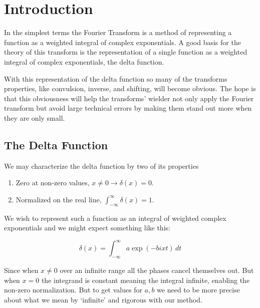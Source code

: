\chapter{Introduction}
In the simplest terms the Fourier Transform is a method of representing a function as a weighted integral of complex exponentials.
A good basis for the theory of this transform is the representation of a single function as a weighted integral of complex exponentials, the delta function.

With this representation of the delta function so many of the transforms properties, like convulsion, inverse, and shifting, will become obvious.
The hope is that this obviousness will help the transforms' wielder not only apply the Fourier transform but avoid large technical errors by making them stand out more when they are only small.

\section{The Delta Function}
We may characterize the delta function by two of its properties
\begin{enumerate}
\item Zero at non-zero values, $x\neq 0 \rightarrow \delta(x) = 0$.
\item Normalized on the real line, $\int_{-\infty}^{\infty}\delta(x) = 1$.
\end{enumerate}

We wish to represent such a function as an integral of weighted complex exponentials and we might expect something like this:

\[\delta(x) = \int_{-\infty}^{\infty}a\exp(-bixt)\,dt\]

Since when $x\neq 0$ over an infinite range all the phases cancel themselves out.
But when $x=0$ the integrand is constant meaning the integral infinite, enabling the non-zero normalization.
But to get values for $a,b$ we need to be more precise about what we mean by `infinite' and rigorous with our method.
\\

